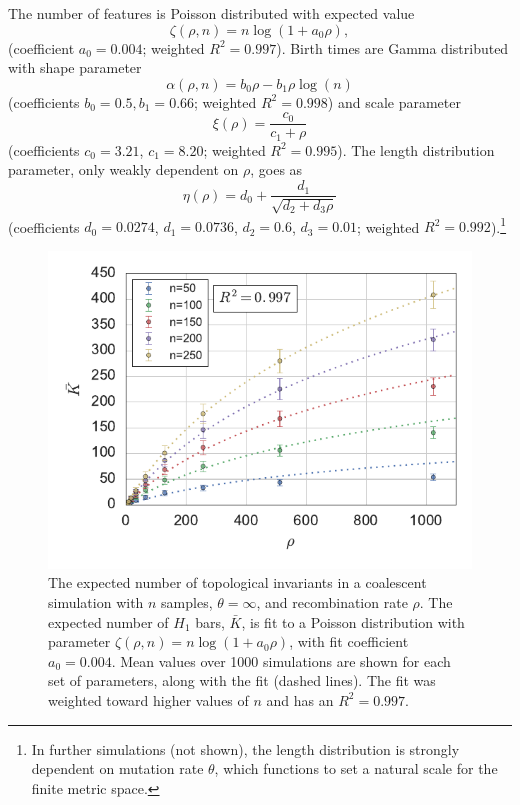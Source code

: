 The number of features is Poisson distributed with expected value
\begin{equation}
\zeta(\rho, n) = n\log\left(1 + a_{0}\rho\right),
\end{equation}
(coefficient $a_0=0.004$; weighted $R^2=0.997$).
Birth times are Gamma distributed with shape parameter
\begin{equation}
\alpha(\rho, n)=b_{0}\rho - b_{1}\rho\log(n)
\end{equation}
(coefficients $b_{0}=0.5, b_{1}=0.66$; weighted $R^2=0.998$) and scale parameter
\begin{equation}
\xi(\rho)=\frac{c_{0}}{c_{1}+\rho}
\end{equation}
(coefficients $c_{0}=3.21$, $c_{1}=8.20$; weighted $R^2=0.995$).
The length distribution parameter, only weakly dependent on $\rho$, goes as
\begin{equation}
\eta(\rho)=d_{0} + \frac{d_{1}}{\sqrt{d_{2}+d_{3}\rho}}
\end{equation}
(coefficients $d_{0}=0.0274$, $d_{1}=0.0736$, $d_{2}=0.6$, $d_{3}=0.01$; weighted $R^2=0.992$).\footnote{In further simulations (not shown), the length distribution is strongly dependent on mutation rate $\theta$, which functions to set a natural scale for the finite metric space.}

\begin{figure}
\begin{center}
\centerline{\includegraphics[]{./fig/parametric_inference/coalescent_sims_fig2.pdf}}
\caption[Fitting the Poisson parameter $\zeta(\rho,n)$ for the expected number of invariants, $\bar{K}$]{The expected number of topological invariants in a coalescent simulation with $n$ samples, $\theta=\infty$, and recombination rate $\rho$. The expected number of $H_1$ bars, $\bar{K}$, is fit to a Poisson distribution with parameter $\zeta(\rho, n) = n\log\left(1 + a_{0}\rho\right)$, with fit coefficient $a_0=0.004$. Mean values over 1000 simulations are shown for each set of parameters, along with the fit (dashed lines). The fit was weighted toward higher values of $n$ and has an $R^2=0.997$.}
\label{fig:coalescent_sims_fig2}
\end{center}
\end{figure}

